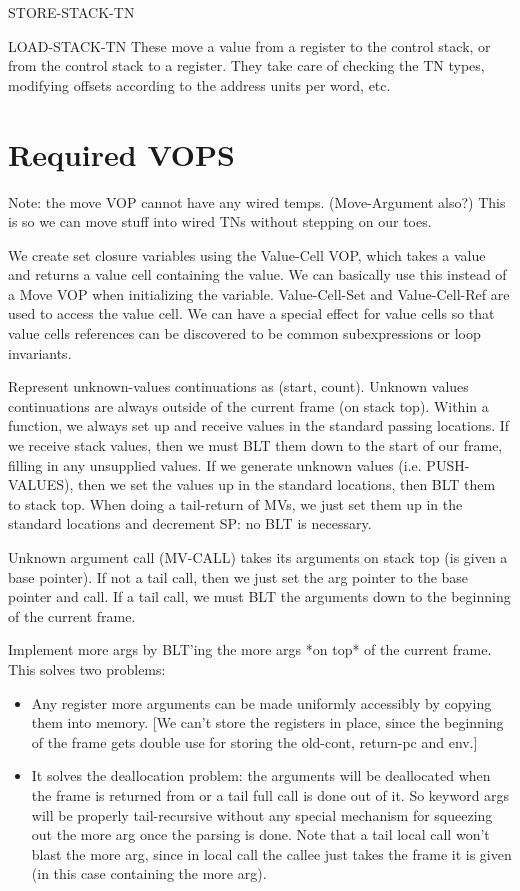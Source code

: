 \begin{Lentry}
\item[STORE-STACK-TN]
\item[LOAD-STACK-TN]
   These move a value from a register to the control stack, or from the
   control stack to a register.  They take care of checking the TN types,
   modifying offsets according to the address units per word, etc.
\end{Lentry}

\chapter{Required VOPS}


Note: the move VOP cannot have any wired temps.  (Move-Argument also?)  This is
so we can move stuff into wired TNs without stepping on our toes.


We create set closure variables using the Value-Cell VOP, which takes a value
and returns a value cell containing the value.  We can basically use this
instead of a Move VOP when initializing the variable.  Value-Cell-Set and
Value-Cell-Ref are used to access the value cell.  We can have a special effect
for value cells so that value cells references can be discovered to be common
subexpressions or loop invariants.




Represent unknown-values continuations as (start, count).  Unknown values
continuations are always outside of the current frame (on stack top).  Within a
function, we always set up and receive values in the standard passing
locations.  If we receive stack values, then we must BLT them down to the start
of our frame, filling in any unsupplied values.  If we generate unknown values
(i.e. PUSH-VALUES), then we set the values up in the standard locations, then
BLT them to stack top.  When doing a tail-return of MVs, we just set them up in
the standard locations and decrement SP: no BLT is necessary.

Unknown argument call (MV-CALL) takes its arguments on stack top (is given a
base pointer).  If not a tail call, then we just set the arg pointer to the
base pointer and call.  If a tail call, we must BLT the arguments down to the
beginning of the current frame.


Implement more args by BLT'ing the more args *on top* of the current frame.
This solves two problems:
\begin{itemize}
\item Any register more arguments can be made uniformly accessibly by copying
    them into memory.  [We can't store the registers in place, since the
    beginning of the frame gets double use for storing the old-cont, return-pc
    and env.]
\item It solves the deallocation problem: the arguments will be deallocated when
    the frame is returned from or a tail full call is done out of it.  So
    keyword args will be properly tail-recursive without any special mechanism
    for squeezing out the more arg once the parsing is done.  Note that a tail
    local call won't blast the more arg, since in local call the callee just
    takes the frame it is given (in this case containing the more arg).
\end{itemize}

